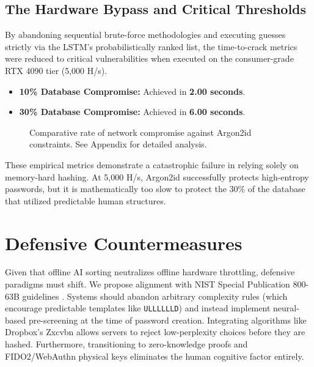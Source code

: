 \documentclass[conference]{IEEEtran}
\begin{document}
\subsection{The Hardware Bypass and Critical Thresholds}
By abandoning sequential brute-force methodologies and executing guesses strictly via the LSTM's probabilistically ranked list, the time-to-crack metrics were reduced to critical vulnerabilities when executed on the consumer-grade RTX 4090 tier (5,000 H/s).

\begin{itemize}
    \item \textbf{10\% Database Compromise:} Achieved in \textbf{2.00 seconds}.
    \item \textbf{30\% Database Compromise:} Achieved in \textbf{6.00 seconds}.
\end{itemize}

\begin{figure}[htbp]
\centering
{}
\caption{Comparative rate of network compromise against Argon2id constraints. See Appendix for detailed analysis.}
\label{fig:compromise}
\end{figure}

These empirical metrics demonstrate a catastrophic failure in relying solely on memory-hard hashing. At 5,000 H/s, Argon2id successfully protects high-entropy passwords, but it is mathematically too slow to protect the 30\% of the database that utilized predictable human structures. 

\section{Defensive Countermeasures}
Given that offline AI sorting neutralizes offline hardware throttling, defensive paradigms must shift. We propose alignment with NIST Special Publication 800-63B guidelines \cite{nist80063b}. Systems should abandon arbitrary complexity rules (which encourage predictable templates like \texttt{ULLLLLLD}) and instead implement neural-based pre-screening at the time of password creation. Integrating algorithms like Dropbox's Zxcvbn \cite{wheeler2016} allows servers to reject low-perplexity choices before they are hashed. Furthermore, transitioning to zero-knowledge proofs and FIDO2/WebAuthn physical keys eliminates the human cognitive factor entirely.
\end{document}
